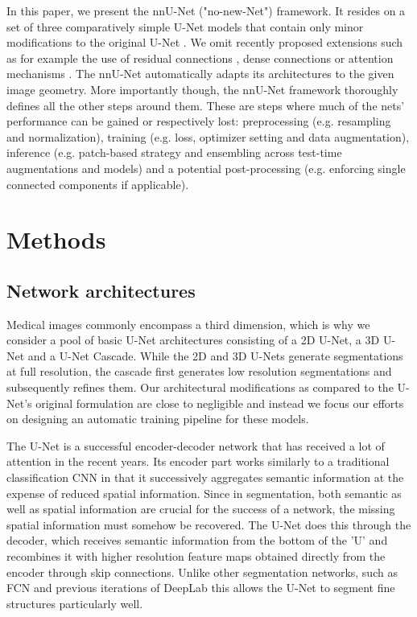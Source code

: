 \documentclass{templates/llncs}
\begin{document}
    In this paper, we present the nnU-Net ("no-new-Net") framework. It resides on a set of three comparatively simple U-Net models that contain only minor modifications to the original U-Net \cite{ronneberger2015u}. We omit recently proposed extensions such as for example the use of residual connections \cite{he2016identity,milletari2016v}, dense connections \cite{jegou2017one} or attention mechanisms \cite{oktay2018attention}. The nnU-Net automatically adapts its architectures to the given image geometry. More importantly though, the nnU-Net framework thoroughly defines all the other steps around them. These are steps where much of the nets' performance can be gained or respectively lost: preprocessing (e.g. resampling and normalization), training (e.g. loss, optimizer setting and data augmentation), inference (e.g. patch-based strategy and ensembling across test-time augmentations and models) and a potential post-processing (e.g. enforcing single connected components if applicable).






\section{Methods}
    \label{methods}
    \subsection{Network architectures}
    \label{networkarchitecture}
    
    Medical images commonly encompass a third dimension, which is why we consider a pool of basic U-Net architectures consisting of a 2D U-Net, a 3D U-Net and a U-Net Cascade. While the 2D and 3D U-Nets generate segmentations at full resolution, the cascade first generates low resolution segmentations and subsequently refines them. Our architectural modifications as compared to the U-Net's original formulation are close to negligible and instead we focus our efforts on designing an automatic training pipeline for these models.
    
    The U-Net \cite{ronneberger2015u} is a successful encoder-decoder network that has received a lot of attention in the recent years. Its encoder part works similarly to a traditional classification CNN in that it successively aggregates semantic information at the expense of reduced spatial information. Since in segmentation, both semantic as well as spatial information are crucial for the success of a network, the missing spatial information must somehow be recovered. The U-Net does this through the decoder, which receives semantic information from the bottom of the 'U' and recombines it with higher resolution feature maps obtained directly from the encoder through skip connections. Unlike other segmentation networks, such as FCN \cite{long2015fully} and previous iterations of DeepLab \cite{chen2018deeplab} this allows the U-Net to segment fine structures particularly well.
    
\end{document}
